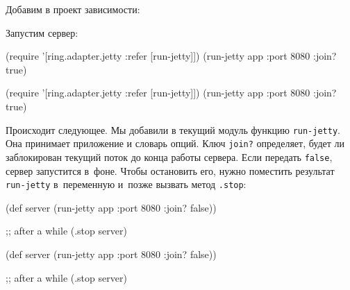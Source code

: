 
Добавим в проект зависимости:

\begin{english}
  \begin{clojure}
  \end{clojure}
\end{english}

Запустим сервер:

\ifx\devicetype\mobile

\begin{english}
  \begin{clojure}
(require '[ring.adapter.jetty
           :refer [run-jetty]])
(run-jetty app {:port 8080 :join? true})
  \end{clojure}
\end{english}

\else

\begin{english}
  \begin{clojure}
(require '[ring.adapter.jetty :refer [run-jetty]])
(run-jetty app {:port 8080 :join? true})
  \end{clojure}
\end{english}

\fi

Происходит следующее. Мы добавили в текущий модуль функцию
\verb|run-jetty|. Она принимает приложение и словарь опций. Ключ
\verb|join?| определяет, будет ли заблокирован текущий поток до конца работы
сервера. Если передать \verb|false|, сервер запустится в~фоне. Чтобы
остановить его, нужно поместить результат \verb|run-jetty| в~переменную
и~позже вызвать метод \verb|.stop|:

\ifx\devicetype\mobile

\begin{english}
  \begin{clojure}
(def server
  (run-jetty app {:port 8080
                  :join? false}))

;; after a while
(.stop server)
  \end{clojure}
\end{english}

\else

\begin{english}
  \begin{clojure}
(def server
  (run-jetty app {:port 8080 :join? false}))

;; after a while
(.stop server)
  \end{clojure}
\end{english}

